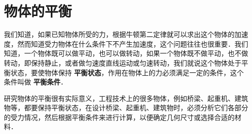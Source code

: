
\chapter{物体的平衡}

我们知道，如果已知物体所受的力，根据牛顿第二定律就可以求出这个物体的加速度，然而知道受力物体在什么条件下不产生加速度，这个问题往往也很重要．我们知道，一个物体既可以做平动，也可以做转动，如果一个物体既不做平动，也不做转动，即保持静止，或者做匀速度直线运动或匀速转动，我们就说这个物体处于平衡状态，要使物体保持\textbf{ 平衡状态}，作用在物体上的力必须满足一定的条件，这个条件叫做\textbf{ 平衡条件}．

研究物体的平衡很有实际意义，工程技术上的很多物体，例如桥梁、起重机、建筑物等，都要保持平衡状态，在设计桥梁、起重机、建筑物时，必须分析它们各部分的受力情况，然后根据平衡条件来进行计算，以便确定几何尺寸或选择合适的材料．

